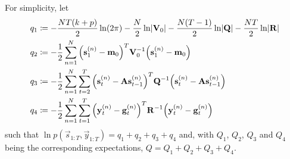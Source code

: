 	For simplicity, let
	\begin{align*}
		q_1 &\coloneqq -\frac{NT(k + p)}{2} \ln(2\pi) - \frac{N}{2} \ln \lvert \boldsymbol{\mathrm{V}}_0 \rvert - \frac{N(T - 1)}{2} \ln \lvert \boldsymbol{\mathrm{Q}} \rvert - \frac{NT}{2} \ln \lvert \boldsymbol{\mathrm{R}} \rvert \\
		q_2 &\coloneqq -\frac{1}{2} \sum_{n = 1}^{N} \Big( \boldsymbol{\mathrm{s}}_1^{(n)} - \boldsymbol{\mathrm{m}}_0 \Big)^T \boldsymbol{\mathrm{V}}_0^{-1} \Big( \boldsymbol{\mathrm{s}}_1^{(n)} - \boldsymbol{\mathrm{m}}_0 \Big) \\
		q_3 &\coloneqq -\frac{1}{2} \sum_{n = 1}^{N} \sum_{t = 2}^{T} \Big( \boldsymbol{\mathrm{s}}_t^{(n)} - \boldsymbol{\mathrm{A}} \boldsymbol{\mathrm{s}}_{t - 1}^{(n)} \Big)^T \boldsymbol{\mathrm{Q}}^{-1} \Big( \boldsymbol{\mathrm{s}}_t^{(n)} - \boldsymbol{\mathrm{A}} \boldsymbol{\mathrm{s}}_{t - 1}^{(n)} \Big) \\
		q_4 &\coloneqq -\frac{1}{2} \sum_{n = 1}^{N} \sum_{t = 1}^{T} \Big( \boldsymbol{\mathrm{y}}_t^{(n)} - \boldsymbol{\mathrm{g}}_t^{(n)} \Big)^T \boldsymbol{\mathrm{R}}^{-1} \Big( \boldsymbol{\mathrm{y}}_t^{(n)} - \boldsymbol{\mathrm{g}}_t^{(n)} \Big)
	\end{align*}
	such that \( \ln p(\vec{s}_{1:T}, \vec{y}_{1:T}) = q_1 + q_2 + q_3 + q_4 \) and, with \(Q_1\), \(Q_2\), \(Q_3\) and \(Q_4\) being the corresponding expectations, \( Q = Q_1 + Q_2 + Q_3 + Q_4 \).

